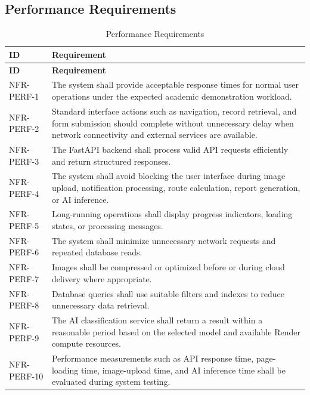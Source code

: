 \subsection{Performance Requirements}
\begin{longtable}{@{}p{2.6cm}p{10.8cm}@{}}
\caption{Performance Requirements} \label{tab:nfr-perf} \\
\toprule \textbf{ID} & \textbf{Requirement} \\ \midrule
\endfirsthead
\toprule \textbf{ID} & \textbf{Requirement} \\ \midrule
\endhead
NFR-PERF-1 & The system shall provide acceptable response times for normal user operations under the expected academic demonstration workload. \\
NFR-PERF-2 & Standard interface actions such as navigation, record retrieval, and form submission should complete without unnecessary delay when network connectivity and external services are available. \\
NFR-PERF-3 & The FastAPI backend shall process valid API requests efficiently and return structured responses. \\
NFR-PERF-4 & The system shall avoid blocking the user interface during image upload, notification processing, route calculation, report generation, or AI inference. \\
NFR-PERF-5 & Long-running operations shall display progress indicators, loading states, or processing messages. \\
NFR-PERF-6 & The system shall minimize unnecessary network requests and repeated database reads. \\
NFR-PERF-7 & Images shall be compressed or optimized before or during cloud delivery where appropriate. \\
NFR-PERF-8 & Database queries shall use suitable filters and indexes to reduce unnecessary data retrieval. \\
NFR-PERF-9 & The AI classification service shall return a result within a reasonable period based on the selected model and available Render compute resources. \\
NFR-PERF-10 & Performance measurements such as API response time, page-loading time, image-upload time, and AI inference time shall be evaluated during system testing. \\
\bottomrule
\end{longtable}

